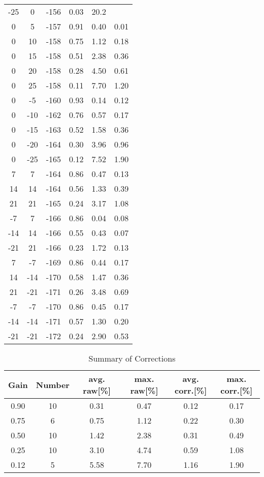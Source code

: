 \begin{table} [t]
\begin{center}
\begin{tabular}{cccccc}
 -25 & 0 & -156 & 0.03 & 20.2 &  \\
 0 & 5   & -157 & 0.91 & 0.40 & 0.01 \\
 0 & 10  & -158 & 0.75 & 1.12 & 0.18 \\
 0 & 15  & -158 & 0.51 & 2.38 & 0.36 \\
 0 & 20  & -158 & 0.28 & 4.50 & 0.61 \\
 0 & 25  & -158 & 0.11 & 7.70 & 1.20 \\
 0 & -5  & -160 & 0.93 & 0.14 & 0.12 \\
 0 & -10 & -162 & 0.76 & 0.57 & 0.17 \\
 0 & -15 & -163 & 0.52 & 1.58 & 0.36 \\
 0 & -20 & -164 & 0.30 & 3.96 & 0.96 \\
 0 & -25 & -165 & 0.12 & 7.52 & 1.90 \\
 7 & 7     & -164 & 0.86 & 0.47 & 0.13 \\
 14 & 14   & -164 & 0.56 & 1.33 & 0.39 \\
 21 & 21   & -165 & 0.24 & 3.17 & 1.08 \\
 -7 & 7    & -166 & 0.86 & 0.04 & 0.08 \\
 -14 & 14  & -166 & 0.55 & 0.43 & 0.07 \\
 -21 & 21  & -166 & 0.23 & 1.72 & 0.13 \\
 7 & -7    & -169 & 0.86 & 0.44 & 0.17 \\
 14 & -14  & -170 & 0.58 & 1.47 & 0.36 \\
 21 & -21  & -171 & 0.26 & 3.48 & 0.69 \\
 -7 & -7   & -170 & 0.86 & 0.45 & 0.17 \\
 -14 & -14 & -171 & 0.57 & 1.30 & 0.20 \\
 -21 & -21 & -172 & 0.24 & 2.90 & 0.53 \\
\hline
\end{tabular}
\medskip

\end{center}
\end{table}

\begin{table} [b]
\begin{center}
\caption{Summary of Corrections}
\medskip
\begin{tabular}{cccccc}
\hline \hline
Gain & Number & avg. raw[\%] & max. raw[\%] & avg. corr.[\%] & max.
					    corr.[\%] \\
\hline
0.90 & 10 & 0.31 & 0.47 & 0.12 & 0.17 \\
0.75 &  6 & 0.75 & 1.12 & 0.22 & 0.30 \\
0.50 & 10 & 1.42 & 2.38 & 0.31 & 0.49 \\
0.25 & 10 & 3.10 & 4.74 & 0.59 & 1.08 \\
0.12 &  5 & 5.58 & 7.70 & 1.16 & 1.90 \\
\end{tabular}
\medskip
\end{center}
\end{table}


